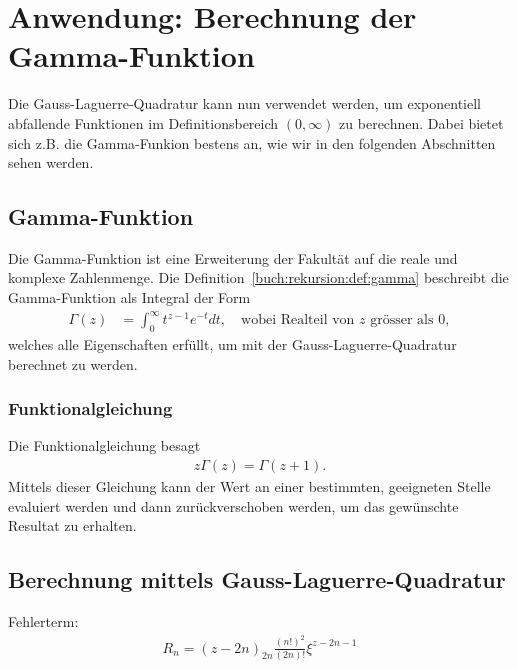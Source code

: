 %
%
%
\section{Anwendung: Berechnung der Gamma-Funktion
  \label{laguerre:section:quad-gamma}}
Die Gauss-Laguerre-Quadratur kann nun verwendet werden,
um exponentiell abfallende Funktionen im Definitionsbereich $(0, \infty)$ zu
berechnen.
Dabei bietet sich z.B. die Gamma-Funkion bestens an, wie wir in den folgenden
Abschnitten sehen werden.

\subsection{Gamma-Funktion}
Die Gamma-Funktion ist eine Erweiterung der Fakultät auf die reale und komplexe
Zahlenmenge.
Die Definition~\ref{buch:rekursion:def:gamma} beschreibt die Gamma-Funktion als
Integral der Form
\begin{align}
\Gamma(z)
 & =
\int_0^\infty t^{z-1} e^{-t} dt
,
\quad
\text{wobei Realteil von $z$ grösser als $0$}
,
\label{laguerre:gamma}
\end{align}
welches alle Eigenschaften erfüllt, um mit der Gauss-Laguerre-Quadratur
berechnet zu werden.

\subsubsection{Funktionalgleichung}
Die Funktionalgleichung besagt
\begin{align}
z \Gamma(z) = \Gamma(z+1).
\label{laguerre:gamma_funktional}
\end{align}
Mittels dieser Gleichung kann der Wert an einer bestimmten,
geeigneten Stelle evaluiert werden und dann zurückverschoben werden,
um das gewünschte Resultat zu erhalten.

\subsection{Berechnung mittels Gauss-Laguerre-Quadratur}

Fehlerterm:
\begin{align*}
R_n
=
(z - 2n)_{2n} \frac{(n!)^2}{(2n)!} \xi^{z-2n-1}
\end{align*}

